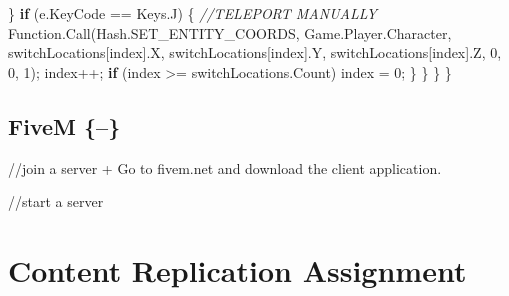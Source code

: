 \documentclass[
  openany]{book}
\newenvironment{Shaded}{\begin{snugshade}}{\end{snugshade}}
\newcommand{\CommentTok}[1]{\textcolor[rgb]{0.56,0.35,0.01}{\textit{#1}}}
\newcommand{\DecValTok}[1]{\textcolor[rgb]{0.00,0.00,0.81}{#1}}
\newcommand{\FunctionTok}[1]{\textcolor[rgb]{0.00,0.00,0.00}{#1}}
\newcommand{\KeywordTok}[1]{\textcolor[rgb]{0.13,0.29,0.53}{\textbf{#1}}}
\newcommand{\NormalTok}[1]{#1}
\begin{document}
\begin{Shaded}
\begin{Highlighting}[]
\NormalTok{           \}}
           \KeywordTok{if}\NormalTok{ (e.}\FunctionTok{KeyCode}\NormalTok{ == Keys.}\FunctionTok{J}\NormalTok{)}
\NormalTok{           \{}
              \CommentTok{//TELEPORT MANUALLY}
\NormalTok{              Function.}\FunctionTok{Call}\NormalTok{(Hash.}\FunctionTok{SET_ENTITY_COORDS}\NormalTok{, Game.}\FunctionTok{Player}\NormalTok{.}\FunctionTok{Character}\NormalTok{, switchLocations[index].}\FunctionTok{X}\NormalTok{, switchLocations[index].}\FunctionTok{Y}\NormalTok{, switchLocations[index].}\FunctionTok{Z}\NormalTok{, }\DecValTok{0}\NormalTok{, }\DecValTok{0}\NormalTok{, }\DecValTok{1}\NormalTok{);}
\NormalTok{              index++;}
              \KeywordTok{if}\NormalTok{ (index >= switchLocations.}\FunctionTok{Count}\NormalTok{) index = }\DecValTok{0}\NormalTok{;}
\NormalTok{            \}}
\NormalTok{        \}}
\NormalTok{    \}}
\NormalTok{\}}


\end{Highlighting}
\end{Shaded}

\hypertarget{fivem}{%
\subsection{FiveM \{--\}}\label{fivem}}

//join a server
+ Go to fivem.net and download the client application.

//start a server

\hypertarget{content-replication-assignment-7}{%
\section*{Content Replication Assignment}\label{content-replication-assignment-7}}
\end{document}
